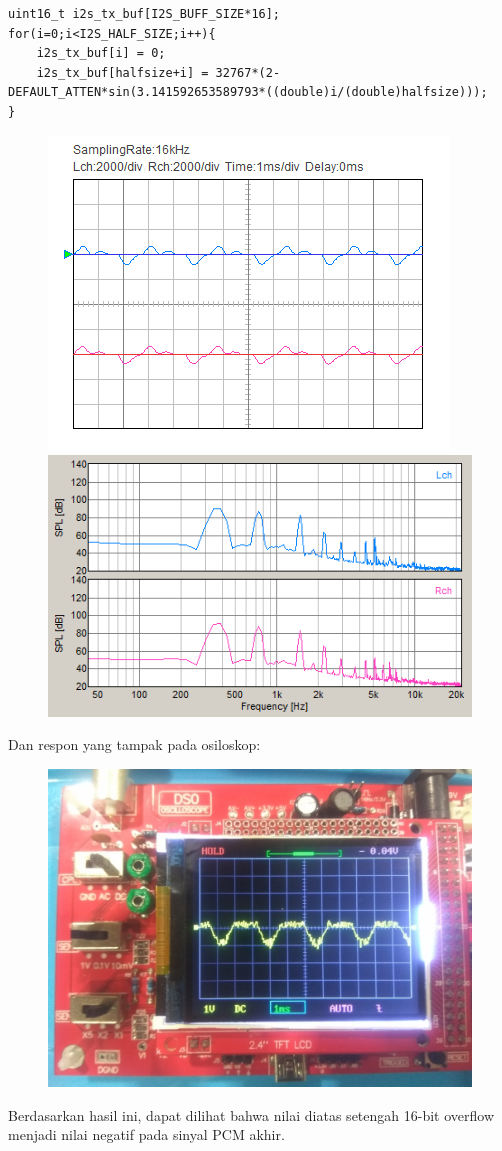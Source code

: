 \documentclass[12pt,]{article}
\begin{document}
\begin{itemize}
\begin{verbatim}
uint16_t i2s_tx_buf[I2S_BUFF_SIZE*16];
for(i=0;i<I2S_HALF_SIZE;i++){
	i2s_tx_buf[i] = 0;
	i2s_tx_buf[halfsize+i] = 32767*(2-DEFAULT_ATTEN*sin(3.141592653589793*((double)i/(double)halfsize)));
}
		\end{verbatim}
		\begin{figure}[H]
			\centering
			\includegraphics[width=0.45\linewidth]{result/day_4/halfdowntone}
			\includegraphics[width=0.45\linewidth]{result/day_4/halfdowntonefft}
		\end{figure}
		\newpage
		Dan respon yang tampak pada osiloskop:
		\begin{figure}[H]
			\centering
			\includegraphics[width=0.5\linewidth]{result/day_4/halfsine}
		\end{figure}
		Berdasarkan hasil ini, dapat dilihat bahwa nilai diatas setengah 16-bit overflow
		menjadi nilai negatif pada sinyal PCM akhir.
		

\end{itemize}
\end{document}
